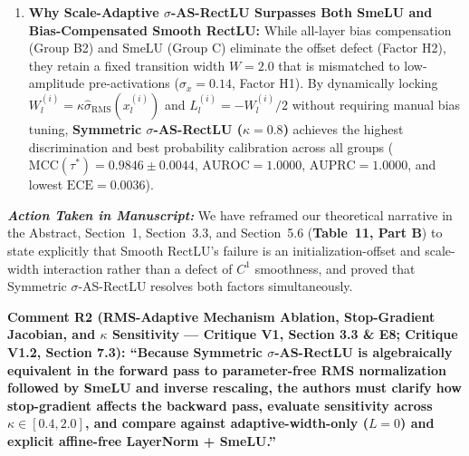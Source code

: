 \documentclass[11pt,a4paper]{article}
\newcommand{\revcomment}[1]{\vspace{0.8em}\noindent\textbf{\textcolor{blue!75!black}{#1}}\par\vspace{0.3em}}
\newcommand{\manuscriptchange}{\vspace{0.3em}\noindent\textit{\textbf{Action Taken in Manuscript: }}}
\begin{document}
\begin{enumerate}
    \item \textbf{Why Scale-Adaptive $\sigma$-AS-RectLU Surpasses Both SmeLU and Bias-Compensated Smooth RectLU:} While all-layer bias compensation (Group B2) and SmeLU (Group C) eliminate the offset defect (Factor H2), they retain a fixed transition width $W=2.0$ that is mismatched to low-amplitude pre-activations ($\sigma_x = 0.14$, Factor H1). By dynamically locking $W_l^{(i)} = \kappa \hat{\sigma}_{\text{RMS}}(x_l^{(i)})$ and $L_l^{(i)} = -W_l^{(i)}/2$ without requiring manual bias tuning, \textbf{Symmetric $\sigma$-AS-RectLU ($\kappa=0.8$)} achieves the highest discrimination and best probability calibration across all groups ($\text{MCC}(\tau^*) = \mathbf{0.9846 \pm 0.0044}$, $\text{AUROC} = \mathbf{1.0000}$, $\text{AUPRC} = \mathbf{1.0000}$, and lowest $\text{ECE} = \mathbf{0.0036}$).
\end{enumerate}

\manuscriptchange We have reframed our theoretical narrative in the Abstract, Section~1, Section~3.3, and Section~5.6 (\textbf{Table~11, Part B}) to state explicitly that Smooth RectLU's failure is an initialization-offset and scale-width interaction rather than a defect of $C^1$ smoothness, and proved that Symmetric $\sigma$-AS-RectLU resolves both factors simultaneously.

\revcomment{Comment R2 (RMS-Adaptive Mechanism Ablation, Stop-Gradient Jacobian, and $\kappa$ Sensitivity --- Critique V1, Section 3.3 \& E8; Critique V1.2, Section 7.3):
``Because Symmetric $\sigma$-AS-RectLU is algebraically equivalent in the forward pass to parameter-free RMS normalization followed by SmeLU and inverse rescaling, the authors must clarify how stop-gradient affects the backward pass, evaluate sensitivity across $\kappa \in [0.4, 2.0]$, and compare against adaptive-width-only ($L=0$) and explicit affine-free LayerNorm + SmeLU.''}
\end{document}
